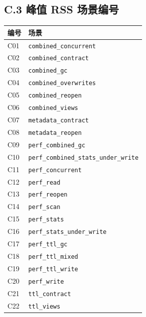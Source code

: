 \documentclass[UTF8,a4paper,10pt,twocolumn,fontset=fandol]{ctexart}
\begin{document}
\subsection*{C.3 峰值 RSS 场景编号}
\begin{center}\small
\begin{tabular}{@{}ll@{}}
\toprule
编号 & 场景 \\
\midrule
C01 & \texttt{combined\_concurrent} \\
C02 & \texttt{combined\_contract} \\
C03 & \texttt{combined\_gc} \\
C04 & \texttt{combined\_overwrites} \\
C05 & \texttt{combined\_reopen} \\
C06 & \texttt{combined\_views} \\
C07 & \texttt{metadata\_contract} \\
C08 & \texttt{metadata\_reopen} \\
C09 & \texttt{perf\_combined\_gc} \\
C10 & \texttt{perf\_combined\_stats\_under\_write} \\
C11 & \texttt{perf\_concurrent} \\
C12 & \texttt{perf\_read} \\
C13 & \texttt{perf\_reopen} \\
C14 & \texttt{perf\_scan} \\
C15 & \texttt{perf\_stats} \\
C16 & \texttt{perf\_stats\_under\_write} \\
C17 & \texttt{perf\_ttl\_gc} \\
C18 & \texttt{perf\_ttl\_mixed} \\
C19 & \texttt{perf\_ttl\_write} \\
C20 & \texttt{perf\_write} \\
C21 & \texttt{ttl\_contract} \\
C22 & \texttt{ttl\_views} \\
\bottomrule
\end{tabular}
\end{center}
\end{document}
